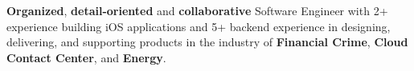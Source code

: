 
\begin{cvparagraph}
    \textbf{Organized}, \textbf{detail-oriented} and \textbf{collaborative} Software Engineer with 2+ experience building iOS applications and 5+ backend experience in designing, delivering, and supporting products in the industry of \textbf{Financial Crime}, \textbf{Cloud Contact Center}, and \textbf{Energy}.
\end{cvparagraph}





